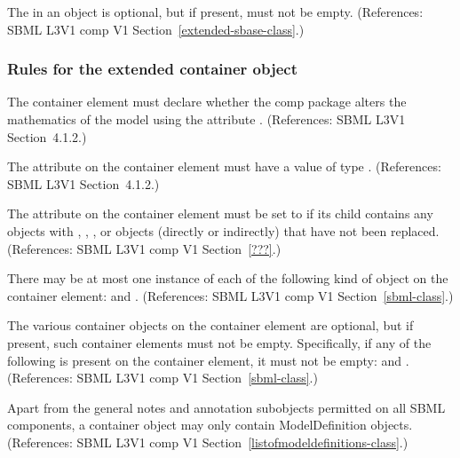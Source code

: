 \begin{sbmlenum}
 { The \ListOfReplacedElements in an \SBase object is
  optional, but if present, must not be empty.
  (References: SBML L3V1 comp V1 Section~\ref{extended-sbase-class}.) }


\end{sbmlenum} \subsubsection*{Rules for the extended  container object} \begin{sbmlenum}

 { The  container element must declare whether 
  the comp package alters the mathematics of the model using the attribute
  .  
  (References: SBML L3V1 Section~4.1.2.) }
  

 { The attribute  on the  
  container element must have a value of type .  
  (References: SBML L3V1 Section~4.1.2.) }
  

 { The attribute  on the  
  container element must be set to  if its
  \Model child contains any \Submodel objects with \Species, \Parameter,
  \Reaction, or \Event objects (directly or indirectly) that have not been
  replaced. 
  (References: SBML L3V1 comp V1 Section~\ref{???}.) }


 { There may be at most one instance of each of the
  following kind of object on the  container element:  
  \ListOfModelDefinitions and \ListOfExternalModelDefinitions. 
  (References: SBML L3V1 comp V1 Section~\ref{sbml-class}.) }


 { The various  container objects on 
  the  container element are optional, but if present, such 
  container elements must not be empty. Specifically, if any of the following 
  is present on the  container element, it must not be empty: 
  \ListOfModelDefinitions and \ListOfExternalModelDefinitions.
  (References: SBML L3V1 comp V1 Section~\ref{sbml-class}.) }
  

 { Apart from the general notes and annotation
  subobjects permitted on all SBML components, a \ListOfModelDefinitions
  container object may only contain ModelDefinition objects.
  (References: SBML L3V1 comp V1 Section~\ref{listofmodeldefinitions-class}.) }



\end{sbmlenum}
